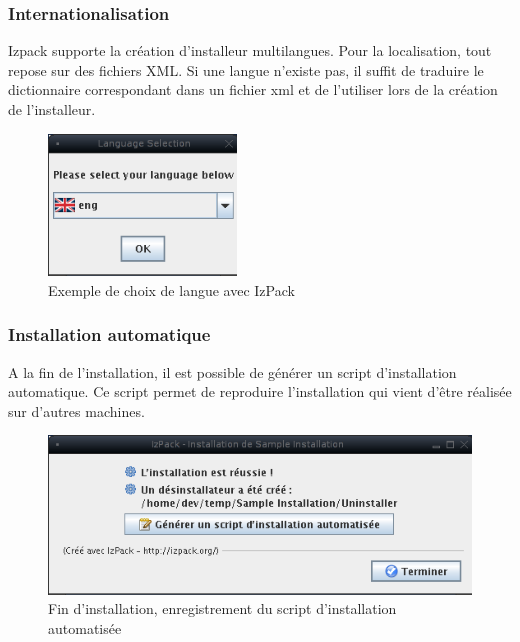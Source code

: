 \subsubsection{Internationalisation}
Izpack supporte la création d'installeur multilangues. 
Pour la localisation, tout repose sur des fichiers XML.
Si une langue n'existe pas, il suffit de traduire le dictionnaire correspondant dans un fichier xml et de l'utiliser lors de la création de l'installeur.
\begin{figure}[H]
	\centering
	\includegraphics[width=5cm]{../image/LangChoice.png}
	\caption{Exemple de choix de langue avec IzPack}
\end{figure}
\subsubsection{Installation automatique}
A la fin de l'installation, il est possible de générer un script d'installation automatique. Ce script permet de reproduire l'installation qui vient d'être réalisée sur d'autres machines.
\begin{figure}[H]
	\centering
	\includegraphics[width=12cm]{../image/SaveInstallXML.png}
	\caption{Fin d'installation, enregistrement du script d'installation automatisée}
\end{figure}
